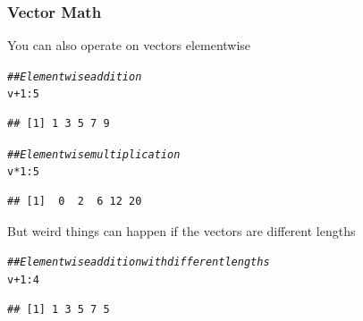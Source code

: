 \documentclass{beamer}\usepackage[]{graphicx}\usepackage[]{color}
\makeatletter
\newcommand{\hlnum}[1]{\textcolor[rgb]{0.686,0.059,0.569}{#1}}%
\newcommand{\hlcom}[1]{\textcolor[rgb]{0.678,0.584,0.686}{\textit{#1}}}%
\newcommand{\hlopt}[1]{\textcolor[rgb]{0,0,0}{#1}}%
\newcommand{\hlstd}[1]{\textcolor[rgb]{0.345,0.345,0.345}{#1}}%
\newenvironment{kframe}{%
 \def\at@end@of@kframe{}%
 \ifinner\ifhmode%
  \def\at@end@of@kframe{\end{minipage}}%
  \begin{minipage}{\columnwidth}%
 \fi\fi%
 \def\FrameCommand##1{\hskip\@totalleftmargin \hskip-\fboxsep
 \colorbox{shadecolor}{##1}\hskip-\fboxsep
     \hskip-\linewidth \hskip-\@totalleftmargin \hskip\columnwidth}%
 \MakeFramed {\advance\hsize-\width
   \@totalleftmargin\z@ \linewidth\hsize
   \@setminipage}}%
 {\par\unskip\endMakeFramed%
 \at@end@of@kframe}
\newenvironment{knitrout}{}{} %
\makeatother
\begin{document}
\begin{frame}[fragile]\frametitle{Vector Math}
    You can also operate on vectors elementwise
\begin{knitrout}\footnotesize
{}\color{fgcolor}\begin{kframe}
\begin{alltt}
\hlcom{## Elementwise addition}
\hlstd{v} \hlopt{+} \hlnum{1}\hlopt{:}\hlnum{5}
\end{alltt}
\begin{verbatim}
## [1] 1 3 5 7 9
\end{verbatim}
\begin{alltt}
\hlcom{## Elementwise multiplication}
\hlstd{v} \hlopt{*} \hlnum{1}\hlopt{:}\hlnum{5}
\end{alltt}
\begin{verbatim}
## [1]  0  2  6 12 20
\end{verbatim}
\end{kframe}
\end{knitrout}
    \vspace{3ex}
    But weird things can happen if the vectors are different lengths
\begin{knitrout}\footnotesize
{}\color{fgcolor}\begin{kframe}
\begin{alltt}
\hlcom{## Elementwise addition with different lengths}
\hlstd{v} \hlopt{+} \hlnum{1}\hlopt{:}\hlnum{4}
\end{alltt}


{\ttfamily\noindent\color{warningcolor}{\#\# Warning in v + 1:4: longer object length is not a multiple of shorter object length}}\begin{verbatim}
## [1] 1 3 5 7 5
\end{verbatim}
\end{kframe}
\end{knitrout}
\end{frame}
\end{document}
